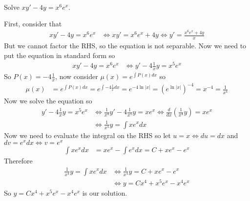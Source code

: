 \documentclass[notes]{subfiles}
\begin{document}
\begin{exercise}
    Solve $xy' - 4y = x^6 e^x$.
\end{exercise}
\begin{solution}
    First, consider that
    \begin{align*}
        xy' - 4y = x^6 e^x
        &\iff xy' = x^6 e^x + 4y
        \iff y' = \frac{x^6 e^x + 4y}{x}
    \end{align*}
    But we cannot factor the RHS, so the equation is not separable. Now we need to put the equation in standard form so
    \begin{align*}
        xy' - 4y = x^6 e^x
        &\iff y' - 4\frac{1}{x}y = x^5 e^x
    \end{align*}
    So $P(x) = -4\frac{1}{x}$, now consider $\mu(x) = e^{\int P(x)dx}$ so
    \begin{align*}
        \mu(x)
        &= e^{\int P(x)dx}
        = e^{\int -4\frac{1}{x}dx}
        = e^{-4\ln|x|}
        = (e^{\ln|x|})^{-4}
        = x^{-4}
        = \frac{1}{x^4}
    \end{align*}
    Now we solve the equation so
    \begin{align*}
        y' - 4\frac{1}{x}y = x^5 e^x
        &\iff \frac{1}{x^4} y' - 4\frac{1}{x^5}y = x e^x
        \iff \frac{d}{dx}\left( \frac{1}{x^4}y \right) = x e^x \\
        &\iff \frac{1}{x^4}y = \int x e^x dx
    \end{align*}
    Now we need to evaluate the integral on the RHS so let $u = x \iff du = dx$ and $dv = e^x dx \iff v = e^x$
    \begin{align*}
        \int x e^x dx
        &= x e^x - \int e^x dx
        = C + x e^x - e^x
    \end{align*}
    Therefore
    \begin{align*}
        \frac{1}{x^4}y = \int x e^x dx
        &\iff \frac{1}{x^4}y = C + x e^x - e^x \\
        &\iff y = Cx^4 + x^5 e^x - x^4 e^x
    \end{align*}
    So $y = Cx^4 + x^5 e^x - x^4 e^x$ is our solution.
\end{solution}
\end{document}
